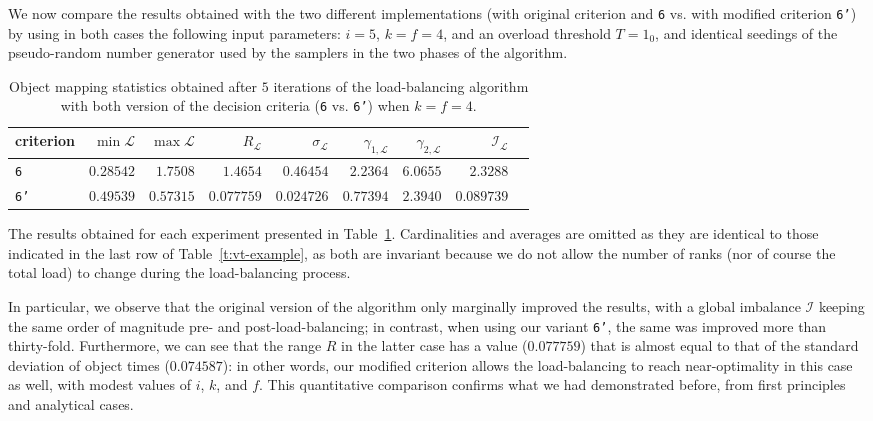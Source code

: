We now compare the results obtained with the two different
implementations (with original criterion and
\texttt{6} vs. with modified criterion \texttt{6'}) by
using in both cases the following input parameters: $i=5$, $k=f=4$,
and an overload threshold $T=1_0$, and identical seedings of the
pseudo-random number generator used by the samplers in the two phases
of the algorithm.

\begin{table}[htb!]
\begin{center}
\begin{tabular}{@{}lrrrrrrrr@{}}
\hline
criterion &
$\min{\mathcal{L}}$ &
$\max{\mathcal{L}}$ &
$R_{\mathcal{L}}$ &
$\sigma_{\mathcal{L}}$ &
$\gamma_{1,\mathcal{L}}$ &
$\gamma_{2,\mathcal{L}}$ &
$\mathcal{I}_{\mathcal{L}}$ \\
\hline\hline
\texttt{6} &
$0.28542$ & $1.7508$ & $1.4654$ &
$0.46454$ & $2.2364$ & $6.0655$ &
$2.3288$  \\\hline
\texttt{6'} &
$0.49539$  & $0.57315$ & $0.077759$ &
$0.024726$ & $0.77394$ & $2.3940$ &
$0.089739$ \\\hline
\end{tabular}
\end{center}
\caption{\label{t:comparative_results} Object mapping statistics
obtained after $5$ iterations of the load-balancing algorithm with
both version of the decision criteria (\texttt{6} vs. \texttt{6'})
when $k=f=4$.}
\end{table}

The results obtained for each experiment  presented in
Table~\ref{t:comparative_results}. Cardinalities and averages are
omitted as they are identical to those indicated in the last row of
Table~\ref{t:vt-example}, as both are invariant because we do not
allow the number of ranks (nor of course the total load) to change
during the load-balancing process.

In particular, we observe that the original version of the algorithm
only marginally improved the results, with a global imbalance
$\mathcal{I}$ keeping the same order of magnitude pre- and
post-load-balancing; in contrast, when using our variant \texttt{6'}, the
same was improved more than thirty-fold.
Furthermore, we can see that the range $R$ in the latter case has a
value ($0.077759$) that is almost equal to that of the standard
deviation of object times ($0.074587$): in other words, our modified
criterion allows the load-balancing to reach near-optimality in this
case as well, with modest values of $i$, $k$, and $f$.
This quantitative comparison confirms what we had demonstrated before,
from first principles and analytical cases.

